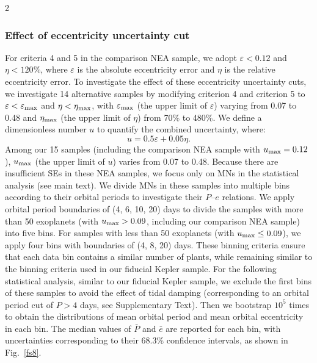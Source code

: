 \documentclass[10pt]{article}
\begin{document}
\begin{multicols}{2}
\subsubsection*{\hypertarget{s2.2}{Effect of eccentricity uncertainty cut}}
\noindent For criteria 4 and 5 in the comparison NEA sample, we adopt $\varepsilon < 0.12$ and $\eta < 120\%$, where $\varepsilon$ is the absolute eccentricity error and $\eta$ is the relative eccentricity error.
To investigate the effect of these eccentricity uncertainty cuts, we investigate 14 alternative samples by modifying criterion 4 and criterion 5 to $\varepsilon < \varepsilon_{\rm max}$ and $\eta < \eta_{\rm max}$, with $\varepsilon_{\rm max}$ (the upper limit of $\varepsilon$) varying from 0.07 to 0.48 and $\eta_{\rm max}$ (the upper limit of $\eta$) from 70\% to 480\%.
We define a dimensionless number $u$ to quantify the combined uncertainty, where:
\begin{equation}
\label{es9}
u = 0.5\varepsilon + 0.05\eta.
\end{equation}
Among our 15 samples (including the comparison NEA sample with $u_{\rm max}=0.12$), $u_{\rm max}$ (the upper limit of $u$) varies from 0.07 to 0.48.
Because there are insufficient SEs in these NEA samples, we focus only on MNs in the statistical analysis (see main text).
We divide MNs in these samples into multiple bins according to their orbital periods to investigate their $P$--$e$ relations.
We apply orbital period boundaries of (4, 6, 10, 20) days to divide the samples with more than 50 exoplanets (with $u_{\rm max}>0.09$, including our comparison NEA sample) into five bins.
For samples with less than 50 exoplanets (with $u_{\rm max}\leq0.09$), we apply four bins with boundaries of (4, 8, 20) days.
These binning criteria ensure that each data bin contains a similar number of plants, while remaining similar to the binning criteria used in our fiducial Kepler sample.
For the following statistical analysis, similar to our fiducial Kepler sample, we exclude the first bins of these samples to avoid the effect of tidal damping (corresponding to an orbital period cut of $P>4$ days, see Supplementary Text).
Then we bootstrap $10^5$ times to obtain the distributions of mean orbital period and mean orbital eccentricity in each bin.
The median values of $\bar{P}$ and $\bar{e}$ are reported for each bin, with uncertainties corresponding to their 68.3\% confidence intervals, as shown in Fig.~\ref{fs8}.


\end{multicols}
\end{document}
